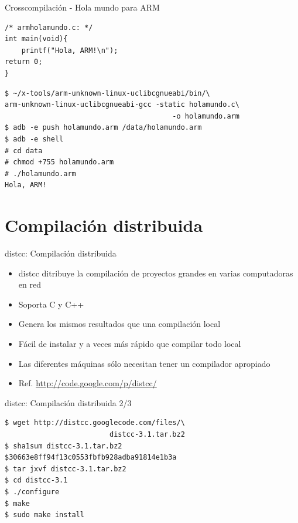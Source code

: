\documentclass[xetex]{beamer}
\begin{document}
\begin{frame}[fragile]{Crosscompilación - Hola mundo para ARM}
  
\begin{lstlisting}
/* armholamundo.c: */
int main(void){
    printf("Hola, ARM!\n");
return 0;
}
\end{lstlisting}  
\begin{verbatim}
$ ~/x-tools/arm-unknown-linux-uclibcgnueabi/bin/\
arm-unknown-linux-uclibcgnueabi-gcc -static holamundo.c\ 
                                        -o holamundo.arm
$ adb -e push holamundo.arm /data/holamundo.arm
$ adb -e shell
# cd data	
# chmod +755 holamundo.arm
# ./holamundo.arm
Hola, ARM! 
\end{verbatim}
\end{frame}


\section{Compilación distribuida}

\begin{frame}{distcc: Compilación distribuida}
\begin{itemize}
  \item distcc ditribuye la compilación de proyectos grandes en varias 
        computadoras en red
  \item Soporta C y C++
  \item Genera los mismos resultados que una compilación local
  \item Fácil de instalar y a veces más rápido que compilar todo local
  \item Las diferentes máquinas sólo necesitan tener un compilador apropiado
  \item Ref. \url{http://code.google.com/p/distcc/}
\end{itemize}
\end{frame}

\begin{frame}[fragile]{distcc: Compilación distribuida 2/3}
\begin{verbatim}
$ wget http://distcc.googlecode.com/files/\
                         distcc-3.1.tar.bz2
$ sha1sum distcc-3.1.tar.bz2
$30663e8ff94f13c0553fbfb928adba91814e1b3a 
$ tar jxvf distcc-3.1.tar.bz2
$ cd distcc-3.1
$ ./configure
$ make
$ sudo make install
\end{verbatim}
\end{frame}
\end{document}
